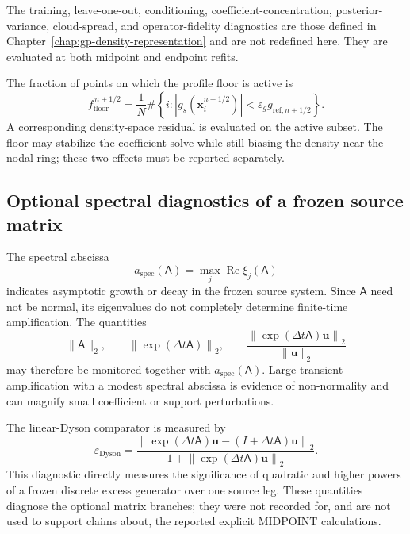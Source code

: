 \documentclass[
  11pt,
  letterpaper,
  onehalfspacing,
  normalmargins,
  equalmargins,
  oneside
]{ut-thesis}
\begin{document}
The training, leave-one-out, conditioning, coefficient-concentration,
posterior-variance, cloud-spread, and operator-fidelity diagnostics are those
defined in Chapter~\ref{chap:gp-density-representation} and are not redefined
here. They are evaluated at both midpoint and endpoint refits.

The fraction of points on which the profile floor is active is
\begin{equation}
 f_{\mathrm{floor}}^{\,n+1/2}
=
\frac{1}{N}
\#\left\{
 i:
 |g_s(\mathbf x_i^{n+1/2})|
<
\varepsilon_g g_{\mathrm{ref},n+1/2}
\right\}.
\label{eq:ch5-floor-fraction}
\end{equation}
A corresponding density-space residual is evaluated on the active subset.
The floor may stabilize the coefficient solve while still biasing the density
near the nodal ring; these two effects must be reported separately.


\subsection{Optional spectral diagnostics of a frozen source matrix}
\label{subsec:ch5-spectral-diagnostics}

The spectral abscissa
\begin{equation}
a_{\mathrm{spec}}(\mathsf A)
=
\max_j\operatorname{Re}\xi_j(\mathsf A)
\label{eq:ch5-spectral-abscissa}
\end{equation}
indicates asymptotic growth or decay in the frozen source system. Since
\(\mathsf A\) need not be normal, its eigenvalues do not completely determine
finite-time amplification. The quantities
\begin{equation}
\|\mathsf A\|_2,
\qquad
\left\|
\exp(\Delta t\mathsf A)
\right\|_2,
\qquad
\frac{
\left\|
\exp(\Delta t\mathsf A)\mathbf u
\right\|_2
}{
\|\mathbf u\|_2
}
\label{eq:ch5-exponential-amplification}
\end{equation}
may therefore be monitored together with \(a_{\mathrm{spec}}(\mathsf A)\). Large transient
amplification with a modest spectral abscissa is evidence of non-normality and
can magnify small coefficient or support perturbations.

The linear-Dyson comparator is measured by
\begin{equation}
\varepsilon_{\mathrm{Dyson}}
=
\frac{
\left\|
\exp(\Delta t\mathsf A)\mathbf u
-
(I+\Delta t\mathsf A)\mathbf u
\right\|_2
}{
1+\left\|
\exp(\Delta t\mathsf A)\mathbf u
\right\|_2
}.
\label{eq:ch5-dyson-comparator-error}
\end{equation}
This diagnostic directly measures the significance of quadratic and higher
powers of a frozen discrete excess generator over one source leg. These
quantities diagnose the optional matrix branches; they were not recorded for,
and are not used to support claims about, the reported explicit MIDPOINT
calculations.
\end{document}
